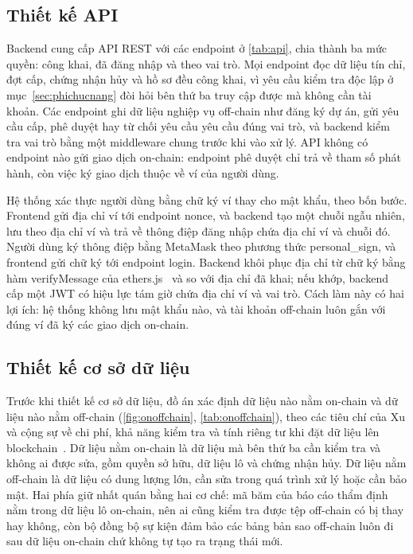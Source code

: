 \HinhTuanTuRetire

\FloatBarrier
\subsection*{Thiết kế API}
\label{subsec:tk-api}

Backend cung cấp API REST với các endpoint ở \autoref{tab:api}, chia thành ba mức quyền: công khai, đã đăng nhập và theo vai trò. Mọi endpoint đọc dữ liệu tín chỉ, đợt cấp, chứng nhận hủy và hồ sơ đều công khai, vì yêu cầu kiểm tra độc lập ở mục~\ref{sec:phichucnang} đòi hỏi bên thứ ba truy cập được mà không cần tài khoản. Các endpoint ghi dữ liệu nghiệp vụ off-chain như đăng ký dự án, gửi yêu cầu cấp, phê duyệt hay từ chối yêu cầu yêu cầu đúng vai trò, và backend kiểm tra vai trò bằng một middleware chung trước khi vào xử lý. API không có endpoint nào gửi giao dịch on-chain: endpoint phê duyệt chỉ trả về tham số phát hành, còn việc ký giao dịch thuộc về ví của người dùng.

\BangAPI

Hệ thống xác thực người dùng bằng chữ ký ví thay cho mật khẩu, theo bốn bước. Frontend gửi địa chỉ ví tới endpoint nonce, và backend tạo một chuỗi ngẫu nhiên, lưu theo địa chỉ ví và trả về thông điệp đăng nhập chứa địa chỉ ví và chuỗi đó. Người dùng ký thông điệp bằng MetaMask theo phương thức personal\_sign, và frontend gửi chữ ký tới endpoint login. Backend khôi phục địa chỉ từ chữ ký bằng hàm verifyMessage của ethers.js~\cite{ethers2024docs} và so với địa chỉ đã khai; nếu khớp, backend cấp một JWT có hiệu lực tám giờ chứa địa chỉ ví và vai trò. Cách làm này có hai lợi ích: hệ thống không lưu mật khẩu nào, và tài khoản off-chain luôn gắn với đúng ví đã ký các giao dịch on-chain.

\FloatBarrier
\subsection*{Thiết kế cơ sở dữ liệu}
\label{subsec:tk-csdl}
\label{sec:tk-csdl}
\label{sec:onoffchain}

Trước khi thiết kế cơ sở dữ liệu, đồ án xác định dữ liệu nào nằm on-chain và dữ liệu nào nằm off-chain (\autoref{fig:onoffchain}, \autoref{tab:onoffchain}), theo các tiêu chí của Xu và cộng sự về chi phí, khả năng kiểm tra và tính riêng tư khi đặt dữ liệu lên blockchain~\cite{xu2017taxonomy}. Dữ liệu nằm on-chain là dữ liệu mà bên thứ ba cần kiểm tra và không ai được sửa, gồm quyền sở hữu, dữ liệu lô và chứng nhận hủy. Dữ liệu nằm off-chain là dữ liệu có dung lượng lớn, cần sửa trong quá trình xử lý hoặc cần bảo mật. Hai phía giữ nhất quán bằng hai cơ chế: mã băm của báo cáo thẩm định nằm trong dữ liệu lô on-chain, nên ai cũng kiểm tra được tệp off-chain có bị thay hay không, còn bộ đồng bộ sự kiện đảm bảo các bảng bản sao off-chain luôn đi sau dữ liệu on-chain chứ không tự tạo ra trạng thái mới.

